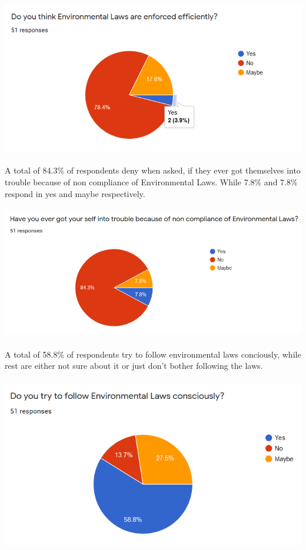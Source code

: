 \documentclass[12pt]{article}
\begin{document}
\\ \\
\includegraphics[scale=1]{3}
\\ \\
A total of 84.3\% of respondents deny when asked, if they ever got themselves into trouble because of non compliance of Environmental Laws. While 7.8\% and 7.8\% respond in yes and maybe respectively.
\\ \\
\includegraphics[scale=0.8]{4}
\\ \\
A total of 58.8\% of respondents try to follow environmental laws conciously, while rest are either not sure about it or just don't bother following the laws. 
\\ \\ 
\includegraphics[scale=0.8]{5}
\end{document}
